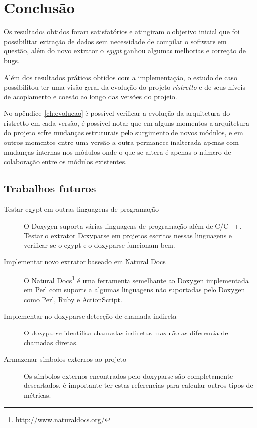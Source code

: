 
\chapter{Conclusão} \label{ch:conclusao}

Os resultados obtidos foram satisfatórios e atingiram o objetivo inicial que
foi possibilitar extração de dados sem necessidade de compilar o software em
questão, além do novo extrator o {\it egypt} ganhou algumas melhorias e
correção de bugs.

Além dos resultados práticos obtidos com a implementação, o estudo de caso
possibilitou ter uma visão geral da evolução do projeto {\it ristretto} e de
seus níveis de acoplamento e coesão ao longo das versões do projeto.

No apêndice~\ref{ch:evolucao} é possível verificar a evolução da arquitetura do
ristretto em cada versão, é possível notar que em alguns momentos a arquitetura
do projeto sofre mudanças estruturais pelo surgimento de novos módulos, e em
outros momentos entre uma versão a outra permanece inalterada apenas com
mudanças internas nos módulos onde o que se altera é apenas o número de
colaboração entre os módulos existentes.

\section{Trabalhos futuros}

\begin{description}

\item[Testar egypt em outras linguagens de programação]
O Doxygen suporta várias linguagens de programação além de C/C++. Testar o
extrator Doxyparse em projetos escritos nessas linguagens e verificar se o
egypt e o doxyparse funcionam bem.

\item[Implementar novo extrator baseado em Natural Docs]
O Natural Docs\footnote{http://www.naturaldocs.org/} é uma ferramenta
semelhante ao Doxygen implementada em Perl com suporte a algumas linguagens não
suportadas pelo Doxygen como Perl, Ruby e ActionScript.

\item[Implementar no doxyparse detecção de chamada indireta]
O doxyparse identifica chamadas indiretas mas não as diferencia de chamadas
diretas.

\item[Armazenar símbolos externos ao projeto]
Os símbolos externos encontrados pelo doxyparse são completamente descartados,
é importante ter estas referencias para calcular outros tipos de métricas.

\end{description}
